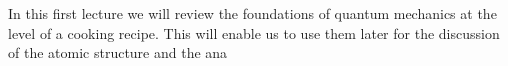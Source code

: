 In this first lecture we will review the foundations of quantum mechanics at the level of a cooking recipe. This will enable us to use them later for the discussion of the atomic structure and the ana